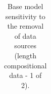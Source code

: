 \documentclass[
]{scrartcl}
\begin{document}
\begin{landscape}
\begin{flushleft}
\begin{longtable}[t]
\end{longtable}

\endgroup{}

\end{flushleft}

\end{landscape}

\newpage{}

\begin{landscape}
\begingroup\fontsize{9}{11}\selectfont

\begin{longtable}[t]{ll>{\raggedright\arraybackslash}p{4em}>{\raggedright\arraybackslash}p{4em}>{\raggedright\arraybackslash}p{4em}>{\raggedright\arraybackslash}p{4em}>{\raggedright\arraybackslash}p{4em}>{\raggedright\arraybackslash}p{4em}>{\raggedright\arraybackslash}p{4em}}

\caption{\label{tbl-sensitivities-like-comps-len1}Base model sensitivity
to the removal of data sources (length compositional data - 1 of 2).}

\tabularnewline


\end{longtable}
\end{landscape}
\end{document}
